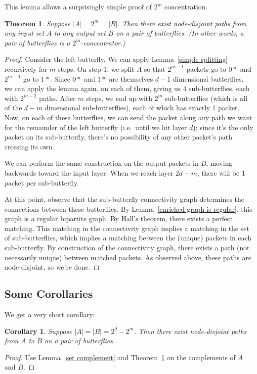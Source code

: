 \documentclass[12pt]{article}
\newtheorem{theorem}{Theorem}
\newtheorem{corollary}{Corollary}
\begin{document}
This lemma allows a surprisingly simple proof of $2^{m}$ concentration.
\begin{theorem} \label{powers of two}
Suppose $|A|=2^{m}=|B|$.  Then there exist node-disjoint paths
from any input set $A$ to any output set $B$ on a pair of butterflies.
(In other words, a pair of butterflies is a $2^{m}$-concentrator.)
\end{theorem}
\begin{proof}
Consider the left butterfly.
We can apply Lemma~\ref{simple splitting} recursively for $m$ steps.  On
step 1, we split $A$ so that $2^{m-1}$ packets go to $0*$ and 
$2^{m-1}$ go to $1*$.  Since $0*$ and $1*$ are themselves $d-1$ 
dimensional butterflies, we can apply the lemma again, on each
of them, giving us 4 sub-butterflies, each with $2^{m-2}$ 
paths.  After $m$ steps, we end up with $2^{m}$ sub-butterflies
(which is all of the $d-m$ dimensional sub-butterflies),
each of which has exactly 1 packet.  Now, on each of these butterflies,
we can send the packet along any path we want for the remainder
of the left butterfly (i.e.\ until we hit layer $d$); since it's the only 
packet on its sub-butterfly, there's no possibility of any other 
packet's path crossing its own.

We can perform the same construction on the output packets in $B$,
moving backwards toward the input layer.  When we reach layer $2d-m$,
there will be 1 packet per sub-butterfly.

At this point, observe that the sub-butterfly connectivity graph 
determines the connections between these butterflies.
By Lemma~\ref{enriched graph is regular},
this graph is a regular bipartite graph.
By Hall's theorem, there exists a 
perfect matching.  
This matching in the connectivity graph implies a matching in the
set of sub-butterflies, which implies a matching between the (unique)
packets in each sub-butterfly.  By construction of the connectivity
graph, there exists a path (not necessarily unique) between matched
packets.  As observed above, these paths are node-disjoint,
so we're done. \end{proof}

\subsection{Some Corollaries}

We get a very short corollary:
\begin{corollary}
Suppose $|A|=|B| = 2^{d} - 2^{m}$.  Then there exist node-disjoint paths
from $A$ to $B$ on a pair of butterflies.
\end{corollary}
\begin{proof}
Use Lemma~\ref{set complement} and Theorem~\ref{powers of two} on 
the complements of $A$ and $B$. \end{proof}
\end{document}
